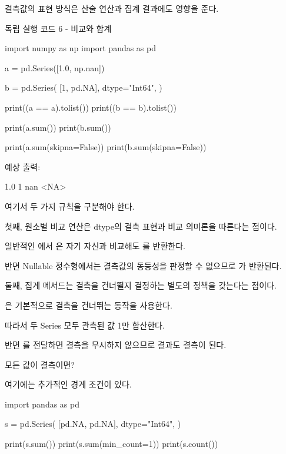결측값의 표현 방식은 산술 연산과 집계 결과에도 영향을 준다.

\begin{dhknote}
\begin{dhksmry}[centered]
독립 실행 코드 6 - 비교와 합계
\end{dhksmry}
\end{dhknote}

\begin{dhkcode}
import numpy as np
import pandas as pd

a = pd.Series([1.0, np.nan])

b = pd.Series(
    [1, pd.NA],
    dtype="Int64",
)

print((a == a).tolist())
print((b == b).tolist())

print(a.sum())
print(b.sum())

print(a.sum(skipna=False))
print(b.sum(skipna=False))
\end{dhkcode}

예상 출력:

\begin{dhkzsh}
1.0
1
nan
<NA>
\end{dhkzsh}

여기서 두 가지 규칙을 구분해야 한다.

첫째, 원소별 비교 연산은 dtype의 결측 표현과 비교 의미론을 따른다는 점이다.

일반적인 에서 은 자기 자신과 비교해도 를 반환한다.

반면 Nullable 정수형에서는 결측값의 동등성을 판정할 수 없으므로 가 반환된다.

둘째, 집계 메서드는 결측을 건너뛸지 결정하는 별도의 정책을 갖는다는 점이다.

은 기본적으로 결측을 건너뛰는  동작을 사용한다.

따라서 두 Series 모두 관측된 값 1만 합산한다.

반면 를 전달하면 결측을 무시하지 않으므로 결과도 결측이 된다.

\begin{dhknote}
\begin{dhksmry}[centered]
모든 값이 결측이면?
\end{dhksmry}
\end{dhknote}

여기에는 추가적인 경계 조건이 있다.

\begin{dhkcode}
import pandas as pd

s = pd.Series(
    [pd.NA, pd.NA],
    dtype="Int64",
)

print(s.sum())
print(s.sum(min_count=1))
print(s.count())
\end{dhkcode}


